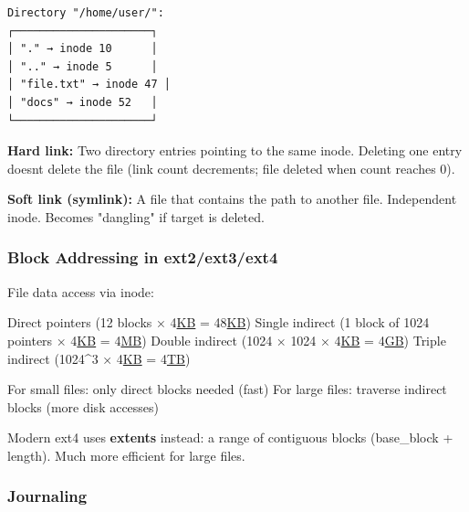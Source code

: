\documentclass[11pt]{article}
\newenvironment{Shaded}{\begin{snugshade}}{\end{snugshade}}
\newcommand{\DecValTok}[1]{\textcolor[rgb]{0.96,0.45,0.00}{#1}}
\newcommand{\ErrorTok}[1]{\textcolor[rgb]{0.85,0.27,0.33}{\underline{#1}}}
\newcommand{\NormalTok}[1]{\textcolor[rgb]{0.81,0.81,0.76}{#1}}
\newcommand{\OperatorTok}[1]{\textcolor[rgb]{0.81,0.81,0.76}{#1}}
\begin{document}
\setcodelang{}

\begin{verbatim}
Directory "/home/user/":
┌─────────────────────┐
│ "." → inode 10      │
│ ".." → inode 5      │
│ "file.txt" → inode 47 │
│ "docs" → inode 52   │
└─────────────────────┘
\end{verbatim}

\textbf{Hard link:} Two directory entries pointing to the same inode. Deleting one entry doesn\textquotesingle t delete the file (link count decrements; file deleted when count reaches 0).

\textbf{Soft link (symlink):} A file that contains the path to another file. Independent inode. Becomes "dangling" if target is deleted.

\subsubsection{Block Addressing in ext2/ext3/ext4}\label{block-addressing-in-ext2ext3ext4}


\begin{Shaded}
\begin{Highlighting}[]
\NormalTok{File data access via inode:}

\NormalTok{Direct pointers (}\DecValTok{12}\NormalTok{ blocks × }\DecValTok{4}\ErrorTok{KB} \OperatorTok{=} \DecValTok{48}\ErrorTok{KB}\NormalTok{)}
\NormalTok{Single indirect (}\DecValTok{1}\NormalTok{ block of }\DecValTok{1024}\NormalTok{ pointers × }\DecValTok{4}\ErrorTok{KB} \OperatorTok{=} \DecValTok{4}\ErrorTok{MB}\NormalTok{)}
\NormalTok{Double indirect (}\DecValTok{1024}\NormalTok{ × }\DecValTok{1024}\NormalTok{ × }\DecValTok{4}\ErrorTok{KB} \OperatorTok{=} \DecValTok{4}\ErrorTok{GB}\NormalTok{)}
\NormalTok{Triple indirect (}\DecValTok{1024}\OperatorTok{\^{}}\DecValTok{3}\NormalTok{ × }\DecValTok{4}\ErrorTok{KB} \OperatorTok{=} \DecValTok{4}\ErrorTok{TB}\NormalTok{)}

\NormalTok{For small files: only direct blocks needed (fast)}
\NormalTok{For large files: traverse indirect blocks (more disk accesses)}
\end{Highlighting}
\end{Shaded}

Modern ext4 uses \textbf{extents} instead: a range of contiguous blocks (base\_block + length). Much more efficient for large files.

\subsubsection{Journaling}\label{journaling}
\end{document}
